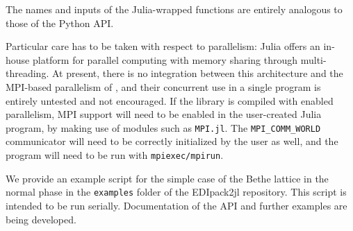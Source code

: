 \documentclass[edipack2.tex]{subfiles}
\begin{document}
The names and inputs of the Julia-wrapped functions are entirely analogous to those of the Python API.

Particular care has to be taken with respect to parallelism: Julia offers an in-house platform for parallel computing with memory sharing through multi-threading. At present, there is no integration between this architecture and the MPI-based parallelism of \NAME{}, and their concurrent use in a single program is entirely untested and not encouraged. If the \NAME{} library is compiled with enabled parallelism, MPI support will need to be enabled in the user-created Julia program, by making use of modules such as {\tt  MPI.jl}. The {\tt MPI\_COMM\_WORLD} communicator will need to be correctly initialized by the user as well, and the program will need to be run with {\tt  mpiexec/mpirun}.

We provide an example script for the simple case of the Bethe lattice in the normal phase in the {\tt  examples} folder of the EDIpack2jl repository. This script is intended to be run serially. Documentation of the API and further examples are being developed.
\end{document}
